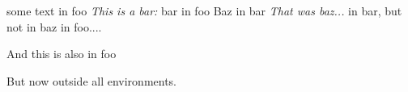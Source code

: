 \begin{foo}
  some text in foo
  \textit{This is a bar:}
    bar in foo
      Baz in bar
    \textit{That was baz...}
    in bar, but not in baz
  in foo....

  And this is also in foo
\end{foo}
But now outside all environments.
